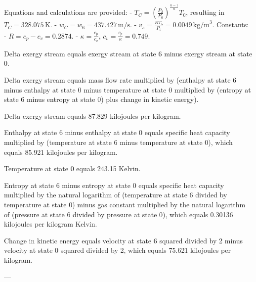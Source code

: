 Equations and calculations are provided:  
- \( T_C = \left( \frac{P_2}{P_0} \right)^{\frac{n-1}{n}} T_0 \), resulting in \( T_C = 328.075 \, \text{K} \).  
- \( w_C = w_6 = 437.427 \, \text{m/s} \).  
- \( v_s = \frac{R T_5}{P_5} = 0.0049 \, \text{kg/m}^3 \).  
Constants:  
- \( R = c_p - c_v = 0.2874 \).  
- \( \kappa = \frac{c_p}{c_v} \), \( c_v = \frac{c_p}{\kappa} = 0.749 \).

Delta exergy stream equals exergy stream at state 6 minus exergy stream at state 0.  

Delta exergy stream equals mass flow rate multiplied by (enthalpy at state 6 minus enthalpy at state 0 minus temperature at state 0 multiplied by (entropy at state 6 minus entropy at state 0) plus change in kinetic energy).  

Delta exergy stream equals 87.829 kilojoules per kilogram.  

Enthalpy at state 6 minus enthalpy at state 0 equals specific heat capacity multiplied by (temperature at state 6 minus temperature at state 0), which equals 85.921 kilojoules per kilogram.  

Temperature at state 0 equals 243.15 Kelvin.  

Entropy at state 6 minus entropy at state 0 equals specific heat capacity multiplied by the natural logarithm of (temperature at state 6 divided by temperature at state 0) minus gas constant multiplied by the natural logarithm of (pressure at state 6 divided by pressure at state 0), which equals 0.30136 kilojoules per kilogram Kelvin.  

Change in kinetic energy equals velocity at state 6 squared divided by 2 minus velocity at state 0 squared divided by 2, which equals 75.621 kilojoules per kilogram.  

---